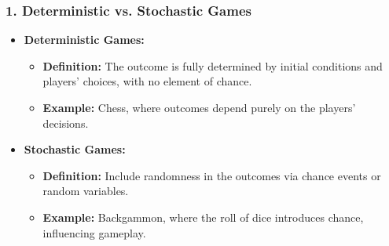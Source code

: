\documentclass[aspectratio=169]{beamer}
\begin{document}
\begin{frame}[fragile]
    \frametitle{1. Deterministic vs. Stochastic Games}
    \begin{itemize}
        \item \textbf{Deterministic Games:}
            \begin{itemize}
                \item \textbf{Definition:} The outcome is fully determined by initial conditions and players' choices, with no element of chance.
                \item \textbf{Example:} Chess, where outcomes depend purely on the players' decisions.
            \end{itemize}
        
        \item \textbf{Stochastic Games:}
            \begin{itemize}
                \item \textbf{Definition:} Include randomness in the outcomes via chance events or random variables.
                \item \textbf{Example:} Backgammon, where the roll of dice introduces chance, influencing gameplay.
            \end{itemize}
    \end{itemize}
\end{frame}
\end{document}
